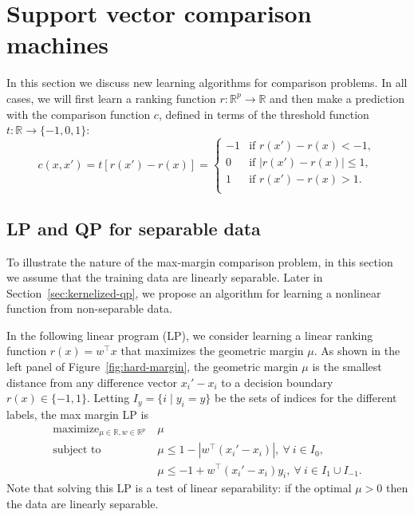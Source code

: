 \documentclass{article}
\newcommand{\RR}{\mathbb R}
\DeclareMathOperator*{\maximize}{maximize}
\begin{document}
\section{Support vector comparison machines}
\label{sec:svm-compare}

In this section we discuss new learning algorithms for comparison
problems. In all cases, we will first learn a ranking function
$r:\RR^p\rightarrow\RR$ and then make a prediction with the comparison
function $c$, defined in terms of the threshold function
$t:\RR\rightarrow\{-1,0,1\}$:
\begin{equation}
  \label{eq:compare_threshold}
  c(x, x') =
  t\left[
    r(x')-r(x)
  \right]
  =
  \begin{cases}
    -1 & \text{if } r(x') - r(x) < -1, \\
    0 & \text{if } |r(x') - r(x)| \leq 1, \\
    1 & \text{if } r(x') - r(x) > 1. \\
  \end{cases}
\end{equation}

\subsection{LP and QP for separable data}
\label{sec:lp-qp}

To illustrate the nature of the max-margin comparison problem, in this
section we assume that the training data are linearly separable. Later
in Section~\ref{sec:kernelized-qp}, we propose an algorithm for
learning a nonlinear function from non-separable data.

In the following linear program (LP), we consider learning a linear
ranking function $r(x)=w^\intercal x$ that maximizes the geometric
margin $\mu$. As shown in the left panel of
Figure~\ref{fig:hard-margin}, the geometric margin $\mu$ is the
smallest distance from any difference vector $x_i'-x_i$ to a decision
boundary $r(x)\in\{-1,1\}$. Letting $I_y=\{i\mid y_i=y\}$ be the sets
of indices for the different labels, the max margin LP is
\begin{equation}
  \label{eq:max-margin-lp}
  \begin{aligned}
    \maximize_{\mu\in\RR, w\in\RR^p}\ & \mu \\
    \text{subject to}\ & \mu \leq 1-|w^\intercal (x_i' - x_i)|,\
    \forall\  i\in I_0,\\
    &\mu \leq -1 +  w^\intercal(x_i'-x_i)y_i,\ \forall\ i\in I_1\cup I_{-1}.
  \end{aligned}
\end{equation}
Note that solving this LP is a test of linear separability: if
the optimal $\mu>0$ then the data are linearly separable. 
\end{document}
